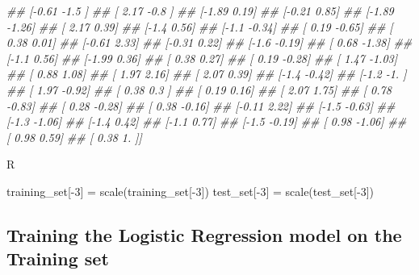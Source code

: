 \documentclass[
]{book}
\newenvironment{Shaded}{\begin{snugshade}}{\end{snugshade}}
\newcommand{\CommentTok}[1]{\textcolor[rgb]{0.56,0.35,0.01}{\textit{#1}}}
\newcommand{\DecValTok}[1]{\textcolor[rgb]{0.00,0.00,0.81}{#1}}
\newcommand{\FunctionTok}[1]{\textcolor[rgb]{0.00,0.00,0.00}{#1}}
\newcommand{\NormalTok}[1]{#1}
\newcommand{\OtherTok}[1]{\textcolor[rgb]{0.56,0.35,0.01}{#1}}
\newcommand{\SpecialCharTok}[1]{\textcolor[rgb]{0.00,0.00,0.00}{#1}}
\theoremstyle{definition}
\theoremstyle{definition}
\theoremstyle{definition}
\theoremstyle{definition}
\theoremstyle{remark}
\begin{document}
\begin{Shaded}
\begin{Highlighting}[]
\CommentTok{\#\#  [{-}0.61 {-}1.5 ]}
\CommentTok{\#\#  [ 2.17 {-}0.8 ]}
\CommentTok{\#\#  [{-}1.89  0.19]}
\CommentTok{\#\#  [{-}0.21  0.85]}
\CommentTok{\#\#  [{-}1.89 {-}1.26]}
\CommentTok{\#\#  [ 2.17  0.39]}
\CommentTok{\#\#  [{-}1.4   0.56]}
\CommentTok{\#\#  [{-}1.1  {-}0.34]}
\CommentTok{\#\#  [ 0.19 {-}0.65]}
\CommentTok{\#\#  [ 0.38  0.01]}
\CommentTok{\#\#  [{-}0.61  2.33]}
\CommentTok{\#\#  [{-}0.31  0.22]}
\CommentTok{\#\#  [{-}1.6  {-}0.19]}
\CommentTok{\#\#  [ 0.68 {-}1.38]}
\CommentTok{\#\#  [{-}1.1   0.56]}
\CommentTok{\#\#  [{-}1.99  0.36]}
\CommentTok{\#\#  [ 0.38  0.27]}
\CommentTok{\#\#  [ 0.19 {-}0.28]}
\CommentTok{\#\#  [ 1.47 {-}1.03]}
\CommentTok{\#\#  [ 0.88  1.08]}
\CommentTok{\#\#  [ 1.97  2.16]}
\CommentTok{\#\#  [ 2.07  0.39]}
\CommentTok{\#\#  [{-}1.4  {-}0.42]}
\CommentTok{\#\#  [{-}1.2  {-}1.  ]}
\CommentTok{\#\#  [ 1.97 {-}0.92]}
\CommentTok{\#\#  [ 0.38  0.3 ]}
\CommentTok{\#\#  [ 0.19  0.16]}
\CommentTok{\#\#  [ 2.07  1.75]}
\CommentTok{\#\#  [ 0.78 {-}0.83]}
\CommentTok{\#\#  [ 0.28 {-}0.28]}
\CommentTok{\#\#  [ 0.38 {-}0.16]}
\CommentTok{\#\#  [{-}0.11  2.22]}
\CommentTok{\#\#  [{-}1.5  {-}0.63]}
\CommentTok{\#\#  [{-}1.3  {-}1.06]}
\CommentTok{\#\#  [{-}1.4   0.42]}
\CommentTok{\#\#  [{-}1.1   0.77]}
\CommentTok{\#\#  [{-}1.5  {-}0.19]}
\CommentTok{\#\#  [ 0.98 {-}1.06]}
\CommentTok{\#\#  [ 0.98  0.59]}
\CommentTok{\#\#  [ 0.38  1.  ]]}
\end{Highlighting}
\end{Shaded}

R

\begin{Shaded}
\begin{Highlighting}[]
\NormalTok{training\_set[}\SpecialCharTok{{-}}\DecValTok{3}\NormalTok{] }\OtherTok{=} \FunctionTok{scale}\NormalTok{(training\_set[}\SpecialCharTok{{-}}\DecValTok{3}\NormalTok{])}
\NormalTok{test\_set[}\SpecialCharTok{{-}}\DecValTok{3}\NormalTok{] }\OtherTok{=} \FunctionTok{scale}\NormalTok{(test\_set[}\SpecialCharTok{{-}}\DecValTok{3}\NormalTok{])}
\end{Highlighting}
\end{Shaded}

\hypertarget{training-the-logistic-regression-model-on-the-training-set}{%
\subsection{Training the Logistic Regression model on the Training set}\label{training-the-logistic-regression-model-on-the-training-set}}
\end{document}
